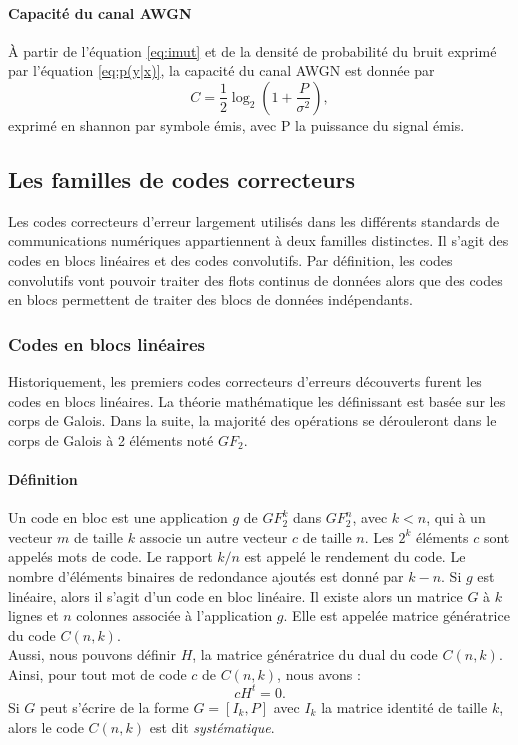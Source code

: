 \paragraph*{Capacité du canal AWGN}
À partir de l'équation \ref{eq:imut} et de la densité de probabilité du bruit exprimé par l'équation \ref{eq:p(y|x)}, la capacité du canal 
AWGN est donnée par \begin{equation}\label{eq:capacity}
C = \frac{1}{2} \log_2\left(1 + \frac{P}{\sigma^2}\right),
\end{equation}
exprimé en shannon par symbole émis, avec P la puissance du signal émis.

\subsection{Les familles de codes correcteurs}
Les codes correcteurs d'erreur largement utilisés dans les différents standards de communications numériques 
appartiennent à deux familles distinctes. Il s'agit des codes en blocs linéaires et des codes convolutifs. Par définition, 
les codes convolutifs vont pouvoir traiter des flots continus de données alors que des codes en blocs permettent 
de traiter des blocs de données indépendants.
\subsubsection{Codes en blocs linéaires}
Historiquement, les premiers codes correcteurs d'erreurs découverts furent les codes en blocs linéaires. La théorie 
mathématique les définissant est basée sur les corps de Galois. Dans la suite, la majorité des opérations se dérouleront 
dans le corps de Galois à 2 éléments noté $GF_2$.
\paragraph*{Définition}
Un code en bloc est une application $g$ de $GF_2^k$ dans $GF_2^n$, avec $k<n$, qui à un vecteur $m$ de taille $k$ associe
un autre vecteur $c$ de taille $n$. Les $2^k$ éléments $c$ sont appelés mots de code. Le rapport $k/n$  est appelé le 
rendement du code. Le nombre d'éléments binaires de redondance ajoutés est donné par $k-n$. Si $g$ est linéaire, alors 
il s'agit d'un code en bloc linéaire. Il existe alors un matrice $G$ à $k$ lignes et $n$ colonnes associée à 
l'application $g$. Elle est appelée matrice génératrice du code $C(n,k)$. \\
Aussi, nous pouvons définir $H$, la matrice génératrice du dual du code $C(n,k)$. Ainsi, pour tout mot de code $c$ de 
$C(n,k)$, nous avons : \[cH^t = 0.\]
Si $G$ peut s'écrire de la forme $G=[I_k,P]$ avec $I_k$ la matrice identité de taille $k$, alors  le code $C(n,k)$ est dit
\emph{systématique}.

